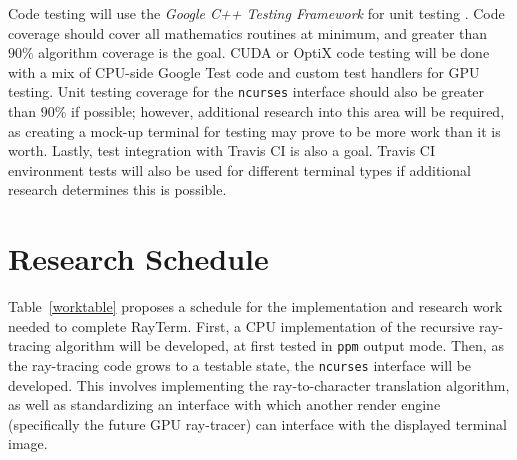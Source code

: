 \documentclass[11pt]{article}
\newcommand{\name}{{\sc RayTerm}}
\begin{document}
Code testing will use the {\it Google C++ Testing Framework} for unit testing \cite{googletest}.
Code coverage should cover all mathematics routines at minimum, and greater than $90\%$ algorithm coverage is the goal.
CUDA or OptiX code testing will be done with a mix of CPU-side Google Test code and custom test handlers for GPU testing.
Unit testing coverage for the \texttt{ncurses} interface should also be greater than $90\%$ if possible; however, additional research into this area will be required, as creating a mock-up terminal for testing may prove to be more work than it is worth.
Lastly, test integration with Travis CI is also a goal.
Travis CI environment tests will also be used for different terminal types if additional research determines this is possible.

\section{Research Schedule}
\label{sec:schedule}


Table~\ref{worktable} proposes a schedule for the implementation and research work needed to complete \name.
First, a CPU implementation of the recursive ray-tracing algorithm will be developed, at first tested in \texttt{ppm} output mode.
Then, as the ray-tracing code grows to a testable state, the \texttt{ncurses} interface will be developed.
This involves implementing the ray-to-character translation algorithm, as well as standardizing an interface with which another render engine (specifically the future GPU ray-tracer) can interface with the displayed terminal image.
\end{document}
